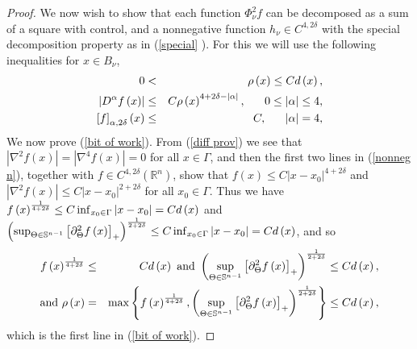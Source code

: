 \documentclass{amsart}
\theoremstyle{plain}
\numberwithin{equation}{section}
\begin{document}
\begin{proof}
We now wish to show that each function $\Phi _{\nu }^{2}f$ can be decomposed
as a sum of a square with control, and a nonnegative function $h_{\nu }\in
C^{4,2\delta }$ with the special decomposition property as in (\ref{special}%
). For this we will use the following inequalities for $x\in B_{\nu }$, 
\begin{eqnarray}
0 &<&\rho \left( x\right) \leq Cd\left( x\right) ,  \label{bit of work} \\
\left\vert D^{\alpha }f\left( x\right) \right\vert &\leq &C\rho \left(
x\right) ^{4+2\delta -\left\vert \alpha \right\vert },\ \ \ \ \ 0\leq
\left\vert \alpha \right\vert \leq 4,  \notag \\
\left[ f\right] _{\alpha ,2\delta }\left( x\right) &\leq &C,\ \ \ \ \
\left\vert \alpha \right\vert =4,  \notag
\end{eqnarray}%
We now prove (\ref{bit of work}). From (\ref{diff prov}) we see that $%
\left\vert \nabla ^{2}f\left( x\right) \right\vert =\left\vert \nabla
^{4}f\left( x\right) \right\vert =0$ for all $x\in \Gamma $, and then the
first two lines in (\ref{nonneg n}), together with $f\in C^{4,2\delta
}\left( \mathbb{R}^{n}\right) $, show that $f\left( x\right) \leq
C\left\vert x-x_{0}\right\vert ^{4+2\delta }$ and $\left\vert \nabla
^{2}f\left( x\right) \right\vert \leq C\left\vert x-x_{0}\right\vert
^{2+2\delta }$ for all $x_{0}\in \Gamma $. Thus we have $f\left( x\right) ^{%
\frac{1}{4+2\delta }}\leq C\inf_{x_{0}\in \Gamma }\left\vert
x-x_{0}\right\vert =Cd\left( x\right) $ and $\left( \sup_{\Theta \in \mathbb{%
S}^{n-1}}\left[ \partial _{\Theta }^{2}f\left( x\right) \right] _{+}\right)
^{\frac{1}{2+2\delta }}\leq C\inf_{x_{0}\in \Gamma }\left\vert
x-x_{0}\right\vert =Cd\left( x\right) $, and so 
\begin{eqnarray*}
f\left( x\right) ^{\frac{1}{4+2\delta }} &\leq &Cd\left( x\right) \text{ and 
}\left( \sup_{\Theta \in \mathbb{S}^{n-1}}\left[ \partial _{\Theta
}^{2}f\left( x\right) \right] _{+}\right) ^{\frac{1}{2+2\delta }}\leq
Cd\left( x\right) , \\
\text{and }\rho \left( x\right) &=&\max \left\{ f\left( x\right) ^{\frac{1}{%
4+2\delta }},\left( \sup_{\Theta \in \mathbb{S}^{n-1}}\left[ \partial
_{\Theta }^{2}f\left( x\right) \right] _{+}\right) ^{\frac{1}{2+2\delta }%
}\right\} \leq Cd\left( x\right) ,
\end{eqnarray*}%
which is the first line in (\ref{bit of work}).


\end{proof}
\end{document}

